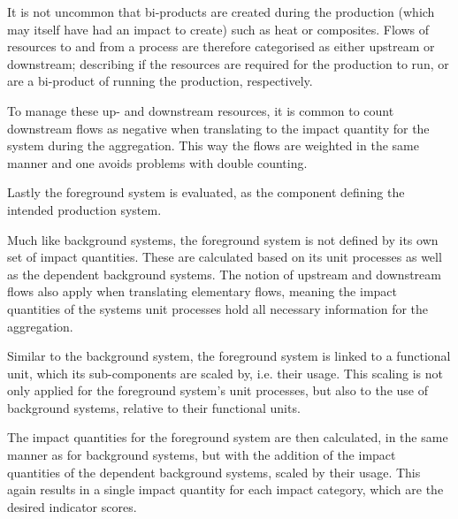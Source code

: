 It is not uncommon that bi-products are created during the production (which may itself have had an impact to create) such as heat or composites. Flows of resources to and from a process are therefore categorised as either upstream or downstream; describing if the resources are required for the production to run, or are a bi-product of running the production, respectively. 

To manage these up- and downstream resources, it is common to count downstream flows as negative when translating to the impact quantity for the system during the aggregation. This way the flows are weighted in the same manner and one avoids problems with double counting.

Lastly the foreground system is evaluated, as the component defining the intended production system. 

Much like background systems, the foreground system is not defined by its own set of impact quantities. These are calculated based on its unit processes as well as the dependent background systems. The notion of upstream and downstream flows also apply when translating elementary flows, meaning the impact quantities of the systems unit processes hold all necessary information for the aggregation. 

Similar to the background system, the foreground system is linked to a functional unit, which its sub-components are scaled by, i.e. their usage. This scaling is not only applied for the foreground system's unit processes, but also to the use of background systems, relative to their functional units.

The impact quantities for the foreground system are then calculated, in the same manner as for background systems, but with the addition of the impact quantities of the dependent background systems, scaled by their usage. This again results in a single impact quantity for each impact category, which are the desired indicator scores.

